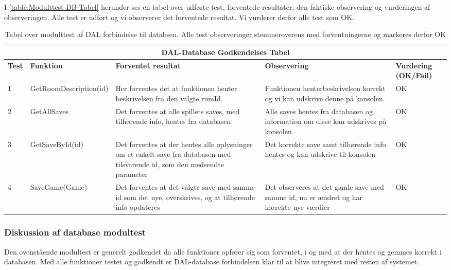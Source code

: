 I \autoref{table:Modulttest-DB-Tabel} herunder ses en tabel over udførte test, forventede resultater, den faktiske observering og vurderingen af observeringen.
Alle test er udført og vi observerer det forventede resultat. Vi vurderer derfor alle test som OK.

\begin{table}[H]
\caption{Tabel over modulttest af DAL forbindelse til databsen. Alle test observeringer stemmeroverens med forventningerne og markeres derfor OK }
\label{table:Modulttest-DB-Tabel}
\begin{tabular}{|p{0.75cm}|p{3.6cm}|p{3.5cm}|p{3.5cm}|p{1.9cm}|} \hline
\multicolumn{5}{|c|}{\textbf{DAL-Database Godkendelses Tabel}} \\ \hline
 \textbf{Test} & \textbf{Funktion} & \textbf{Forventet resultat} & \textbf{Observering} & \textbf{Vurdering} \textbf{(OK/Fail)}\\\hline
 1 & GetRoomDescription(id) & Her forventes det at funktionen henter beskrivelsen fra den valgte rumId. & Funktionen henterbeskrivelsen korrekt og vi kan udskrive denne på konsolen. & OK \\ \hline
 2 & GetAllSaves & Det forventes at alle spillets saves, med tilhørende info, hentes fra databasen & Alle saves hentes fra databasen og information om disse kan udskrives på konsolen. & OK \\ \hline
 3 & GetSaveById(id) & Det forventes at der hentes alle oplysninger om et enkelt save fra databasen med tilsvarende id, som den medsendte parameter & Det korrekte save samt tilhørende info hentes og kan udskrive til konsolen & OK \\ \hline
 4 & SaveGame(Game) & Det forventes at det valgte save med samme id som det nye, overskrives, og at tilhørende info opdateres & Det observeres at det gamle save med samme id, nu er ændret og har korrekte nye værdier & OK \\ \hline
\end{tabular}
\end{table}

\subsubsection{Diskussion af database modultest}

Den ovenstående modultest er generelt godkendet da alle funktioner opfører sig som forventet, i og med at der hentes og gemmes korrekt i databasen. Med alle funktioner testet og godkendt er DAL-database forbindelsen klar til at blive integreret med resten af systemet.
